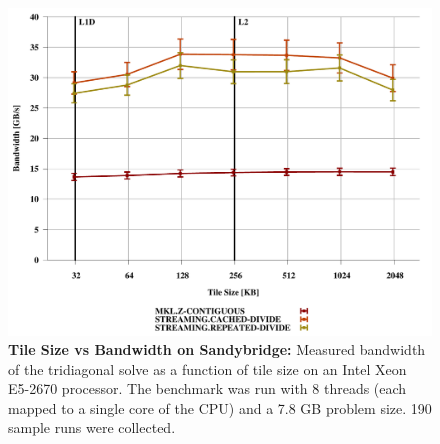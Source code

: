 \documentclass[conference]{IEEEtran}
\newcommand{\fix}[1]{{\bf \textcolor {red}{#1}}}
\begin{document}




\begin{figure}%
\centering
\includegraphics[width=0.9\columnwidth]{figures/post_tsb_tw_sweep_full_matrix_double_precision_production_snb_e5_2670_08_21_2016_8pus.pdf}
\caption{\textbf{Tile Size vs Bandwidth on Sandybridge:}
Measured bandwidth of the tridiagonal solve as a function of tile size on
an Intel Xeon E5-2670 processor. The benchmark was run with 8 threads (each mapped
to a single core of the CPU) and a 7.8 GB problem size. 190 sample runs were
collected.}
\end{figure}
\end{document}
